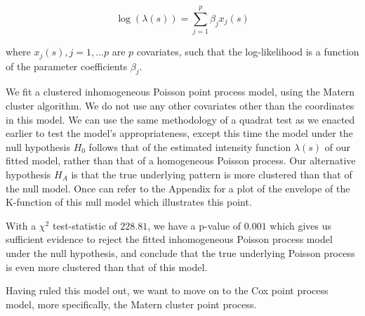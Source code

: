 \documentclass[
  12pt,
]{article}
\begin{document}
\[\log (\lambda(s)) = \sum_{j=1}^p \beta_j x_j(s)\]

where \(x_j(s), j = 1,...p\) are \(p\) covariates, such that the
log-likelihood is a function of the parameter coefficients \(\beta_j\).

We fit a clustered inhomogeneous Poisson point process model, using the
Matern cluster algorithm. We do not use any other covariates other than
the coordinates in this model. We can use the same methodology of a
quadrat test as we enacted earlier to test the model's appropriateness,
except this time the model under the null hypothesis \(H_0\) follows
that of the estimated intensity function \(\lambda(s)\) of our fitted
model, rather than that of a homogeneous Poisson process. Our
alternative hypothesis \(H_A\) is that the true underlying pattern is
more clustered than that of the null model. Once can refer to the
Appendix for a plot of the envelope of the K-function of this null model
which illustrates this point.

\begin{table}[!h]

\caption{\label{tab:fit2-quadrat-test}Results of the quadrat test for the fitted inhomogenous Poisson process model}
\centering
{}
\end{table}

With a \(\chi^2\) test-statistic of \(228.81\), we have a p-value of
\(0.001\) which gives us sufficient evidence to reject the fitted
inhomogeneous Poisson process model under the null hypothesis, and
conclude that the true underlying Poisson process is even more clustered
than that of this model.

Having ruled this model out, we want to move on to the Cox point process
model, more specifically, the Matern cluster point process.
\end{document}
